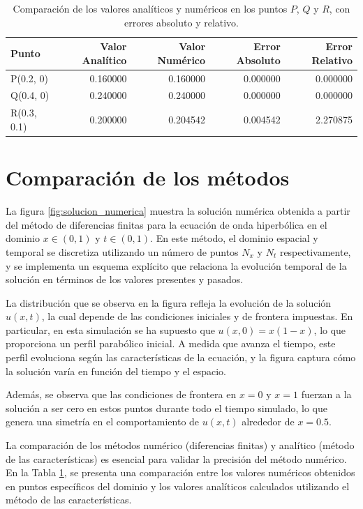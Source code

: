 \begin{table}[h!]
    \centering
    \begin{tabular}{lrrrr}
        \toprule
        Punto & Valor Analítico & Valor Numérico & Error Absoluto & Error Relativo \\
        \midrule
        P(0.2, 0) & 0.160000 & 0.160000 & 0.000000 & 0.000000 \\
        Q(0.4, 0) & 0.240000 & 0.240000 & 0.000000 & 0.000000 \\
        R(0.3, 0.1) & 0.200000 & 0.204542 & 0.004542 & 2.270875 \\
        \bottomrule
    \end{tabular}
    \label{tab:errores}
    \caption{Comparación de los valores analíticos y numéricos en los puntos \( P \), \( Q \) y \( R \), con errores absoluto y relativo.}        
\end{table}

\newpage
\section{Comparación de los métodos}



La figura \ref{fig:solucion_numerica} muestra la solución numérica obtenida a partir del método de diferencias finitas para la ecuación de onda hiperbólica en el dominio \(x \in (0, 1)\) y \(t \in (0, 1)\). En este método, el dominio espacial y temporal se discretiza utilizando un número de puntos \(N_x\) y \(N_t\) respectivamente, y se implementa un esquema explícito que relaciona la evolución temporal de la solución en términos de los valores presentes y pasados.

La distribución que se observa en la figura refleja la evolución de la solución \( u(x, t) \), la cual depende de las condiciones iniciales y de frontera impuestas. En particular, en esta simulación se ha supuesto que \( u(x, 0) = x(1 - x) \), lo que proporciona un perfil parabólico inicial. A medida que avanza el tiempo, este perfil evoluciona según las características de la ecuación, y la figura captura cómo la solución varía en función del tiempo y el espacio.

Además, se observa que las condiciones de frontera en \(x = 0\) y \(x = 1\) fuerzan a la solución a ser cero en estos puntos durante todo el tiempo simulado, lo que genera una simetría en el comportamiento de \(u(x,t)\) alrededor de \(x = 0.5\).


La comparación de los métodos numérico (diferencias finitas) y analítico (método de las características) es esencial para validar la precisión del método numérico. En la Tabla \ref{tab:errores}, se presenta una comparación entre los valores numéricos obtenidos en puntos específicos del dominio y los valores analíticos calculados utilizando el método de las características.

